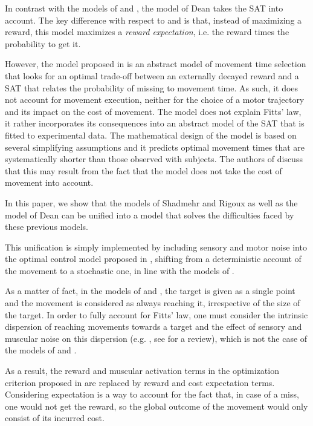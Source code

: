 \documentclass[10pt]{article}
\begin{document}
In contrast with the models of \cite{shadmehr10} and \cite{rigoux12}, the model of Dean \cite{Dean2007} takes the SAT into account. The key difference with respect to \cite{shadmehr10} and \cite{rigoux12} is that, instead of maximizing a reward, this model maximizes a {\em reward expectation}, i.e. the reward times the probability to get it.

However, the model proposed in \cite{Dean2007} is an abstract model of movement time selection that looks for an optimal trade-off between an externally decayed reward and a SAT that relates the probability of missing to movement time. As such, it does not account for movement execution, neither for the choice of a motor trajectory and its impact on the cost of movement.
The model does not explain Fitts' law, it rather incorporates its consequences into an abstract model of the SAT that is fitted to experimental data.
The mathematical design of the model is based on several simplifying assumptions and it predicts optimal movement times that are systematically shorter than those observed with subjects. The authors of \cite{Dean2007} discuss that this may result from the fact that the model does not take the cost of movement into account.

In this paper, we show that the models of Shadmehr \cite{shadmehr10} and Rigoux \cite{rigoux12} as well as the model of Dean \cite{Dean2007} can be unified into a model that solves the difficulties faced by these previous models. 

This unification is simply implemented by including sensory and motor noise into the optimal control model proposed in \cite{rigoux12}, shifting from a deterministic account of the movement to a stochastic one, in line with the models of \cite{harris98_N,todorov02_NN,todorov04_NN,todorov05_NC,li2006}.

As a matter of fact, in the models of \cite{shadmehr10} and \cite{rigoux12}, the target is given as a single point and the movement is considered as always reaching it, irrespective of the size of the target. In order to fully account for Fitts' law, one must consider the intrinsic dispersion of reaching movements towards a target and the effect of sensory and muscular noise on this dispersion (e.g. \cite{harris98_N}, see \cite{faisal08} for a review), which is not the case of the models of \cite{shadmehr10} and \cite{rigoux12}. 

As a result, the reward and muscular activation terms in the optimization criterion proposed in \cite{rigoux12} are replaced by reward and cost expectation terms. Considering expectation is a way to account for the fact that, in case of a miss, one would not get the reward, so the global outcome of the movement would only consist of its incurred cost. 
\end{document}
